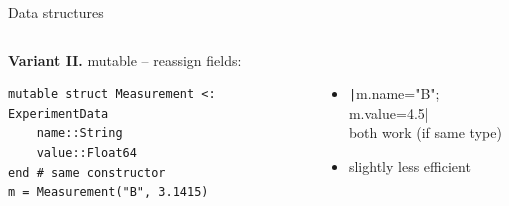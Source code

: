 \documentclass[aspectratio=169, 11pt, handout]{beamer}
\begin{document}
\begin{frame}[fragile]{Data structures}
\begin{columns}[T]
\begin{column}{.5\textwidth}
\begin{itemize}[<+->]
                \end{itemize}
            \end{column}
        \end{columns}
        \pause
        \vspace{1\baselineskip}
        \begin{columns}[T]
            \begin{column}{.51\textwidth}
                \textbf{Variant II.} mutable – reassign fields:
                \begin{verbatim}
mutable struct Measurement <: ExperimentData
    name::String
    value::Float64
end # same constructor
m = Measurement("B", 3.1415)
                \end{verbatim}
            \end{column}
            \begin{column}{.48\textwidth}
                \pause
                \ \\[1.5\baselineskip]
                \begin{itemize}[<+->]
                    \item \texttt|m.name="B"; m.value=4.5|\\
                    both work (if same type)
                    \item slightly less efficient
                \end{itemize}
            \end{column}
        \end{columns}
    \end{frame}
\end{document}
